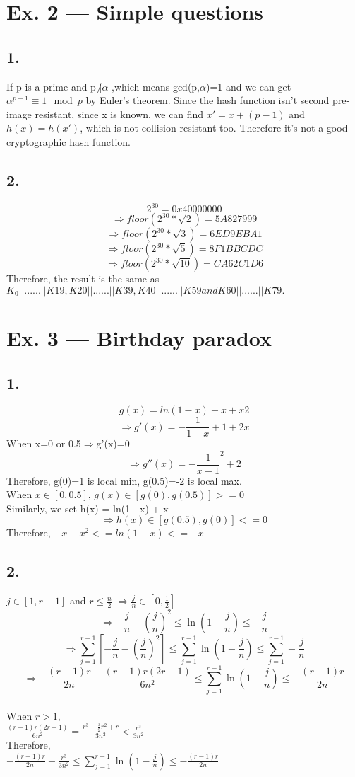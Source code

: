 \documentclass[a4paper,12pt]{journal}
\begin{document}
\section*{Ex. 2 — Simple questions}
\subsection*{1.}
 If p is a prime and p $\not | \alpha$ ,which means gcd(p,$\alpha$)=1 and we can get $\alpha^{p-1} \equiv 1\mod p$ by Euler's theorem. Since the hash function isn't second pre-image resistant, since x is known, we can find $x'=x+(p-1)$ and $h(x)=h(x')$, which is not collision resistant too. Therefore it's not a good cryptographic hash function.\\
\subsection*{2.}
$$2^{30}=0x40000000$$
$$\Rightarrow floor(2^{30}*\sqrt{2})= 5A827999$$
$$\Rightarrow floor(2^{30}*\sqrt{3})= 6ED9EBA1$$
$$\Rightarrow floor(2^{30}*\sqrt{5})= 8F1BBCDC$$
$$\Rightarrow floor(2^{30}*\sqrt{10})=  CA62C1D6$$
Therefore, the result is the same as $K_0||......||K19,K20||......||K39,K40||......||K59 andK60||......||K79.$\\
\section*{Ex. 3 — Birthday paradox}
\subsection*{1.}
$$g(x) = ln(1-x)+x+x2$$
$$\Rightarrow g'(x)=-\frac{1}{1-x}+1+2x$$
When x=0 or 0.5$\Rightarrow$g'(x)=0\\
$$\Rightarrow g''(x)=-\frac{1}{x-1}^{2}+2$$
Therefore, g(0)=1 is local min, g(0.5)=-2 is local max.\\
When $x\in[0,0.5]$, $g(x)\in[g(0),g(0.5)]>=0$\\
Similarly, we set h(x) = ln(1 - x) + x\\
$$\Rightarrow h(x)\in[g(0.5),g(0)]<=0$$
Therefore, $-x-x^2 <= ln(1-x) <= -x$\\
\subsection*{2.}
$j\in[1,r-1]$ and $r\leq \frac{n}{2}$ $\Rightarrow\frac{j}{n}\in\left[0,\frac{1}{2}\right]$
$$\Rightarrow -\frac{j}{n}-\left(\frac{j}{n}\right)^2 \leq \ln\left(1-\frac{j}{n}\right) \leq -\frac{j}{n}$$
$$\Rightarrow\sum_{j=1}^{r-1} \left[ -\frac{j}{n}-\left(\frac{j}{n}\right)^2 \right] \leq \sum_{j=1}^{r-1} \ln\left(1-\frac{j}{n}\right) \leq \sum_{j=1}^{r-1} -\frac{j}{n}$$
$$\Rightarrow-\frac{(r-1)r}{2n}-\frac{(r-1)r(2r-1)}{6n^2} \leq \sum_{j=1}^{r-1} \ln\left(1-\frac{j}{n}\right) \leq -\frac{(r-1)r}{2n}$$
\\
When $r>1$, \\
$\frac{(r-1)r(2r-1)}{6n^2}=\frac{r^3-\frac{3}{2}r^2+r}{3n^2}<\frac{r^3}{3n^2}$\\
Therefore,\\
$-\frac{(r-1)r}{2n}-\frac{r^3}{3n^2} \leq \sum_{j=1}^{r-1} \ln\left(1-\frac{j}{n}\right) \leq -\frac{(r-1)r}{2n}$\\
\end{document}
